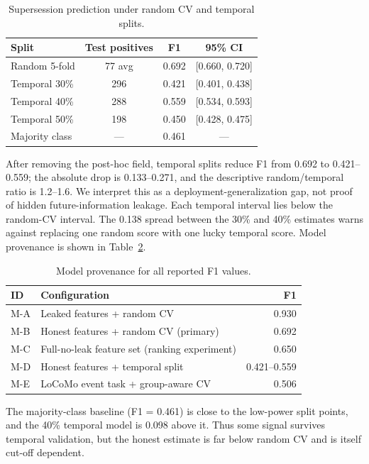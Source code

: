 \documentclass[sigconf,nonacm]{acmart}
\begin{document}
\begin{table}[h]
\centering
\caption{Supersession prediction under random CV and temporal splits.}
\label{tab:temporal}
\begin{tabular}{lccc}
\toprule
Split & Test positives & F1 & 95\% CI \\
\midrule
Random 5-fold & 77 avg & 0.692 & [0.660, 0.720] \\
Temporal 30\% & 296 & 0.421 & [0.401, 0.438] \\
Temporal 40\% & 288 & 0.559 & [0.534, 0.593] \\
Temporal 50\% & 198 & 0.450 & [0.428, 0.475] \\
Majority class & --- & 0.461 & --- \\
\bottomrule
\end{tabular}
\end{table}

After removing the post-hoc field, temporal splits reduce F1 from 0.692 to 0.421--0.559; the absolute drop is 0.133--0.271, and the descriptive random/temporal ratio is 1.2--1.6. We interpret this as a deployment-generalization gap, not proof of hidden future-information leakage. Each temporal interval lies below the random-CV interval. The 0.138 spread between the 30\% and 40\% estimates warns against replacing one random score with one lucky temporal score. Model provenance is shown in Table~\ref{tab:model-prov}.

\begin{table}[h]
\centering
\caption{Model provenance for all reported F1 values.}
\label{tab:model-prov}
\begin{tabular}{llr}
\toprule
ID & Configuration & F1 \\
\midrule
M-A & Leaked features + random CV & 0.930 \\
M-B & Honest features + random CV (primary) & 0.692 \\
M-C & Full-no-leak feature set (ranking experiment) & 0.650 \\
M-D & Honest features + temporal split & 0.421--0.559 \\
M-E & LoCoMo event task + group-aware CV & 0.506 \\
\bottomrule
\end{tabular}
\end{table} The majority-class baseline (F1 = 0.461) is close to the low-power split points, and the 40\% temporal model is 0.098 above it. Thus some signal survives temporal validation, but the honest estimate is far below random CV and is itself cut-off dependent.
\end{document}
